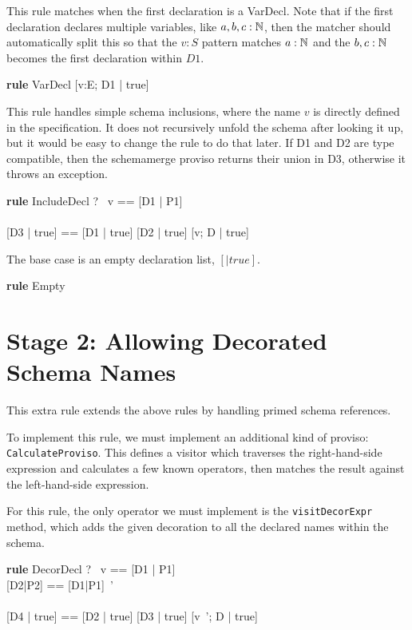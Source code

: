 \documentclass{article}
\newenvironment{zedrule}[1]{\par\textbf{rule }#1\vspace{-1ex}\infrule}{\endinfrule}
\newcommand{\derives}{\derive{}}
\newcommand{\proviso}{\raisebox{0.5ex}{${}_{\blacktriangleright}\ $}}%
\newcommand{\schemamerge}{\mathbin{\textbf{schemamerge}}}
\begin{document}
This rule matches when the first declaration is a VarDecl.
Note that if the first declaration declares multiple variables,
like $a,b,c:{\mathbb N}$, then the matcher should automatically split this
so that the $v:S$ pattern matches $a:{\mathbb N}$ and the $b,c:{\mathbb N}$
becomes the first declaration within $D1$.
\begin{zedrule}{VarDecl}
   [D1 | true] \unfoldsTo [D2 | P2]
\derives
   [v:E; D1 | true] \unfoldsTo [v:E; D2 | P2]
\end{zedrule}

This rule handles simple schema inclusions, where the name
$v$ is directly defined in the specification.  It does not
recursively unfold the schema after looking it up, but it would
be easy to change the rule to do that later.  If D1 and D2 are 
type compatible, then the schemamerge proviso returns their
union in D3, otherwise it throws an exception.

\begin{zedrule}{IncludeDecl}
   \proviso ?~ v == [D1 | P1] \\
   [D | true] \unfoldsTo [D2 | P2] \\
   \proviso [D3 | true] == [D1 | true] \schemamerge [D2 | true]
\derives
   [v; D | true] \unfoldsTo [D3 | P1 \land P2]
\end{zedrule}

The base case is an empty declaration list, $[|true]$.
\begin{zedrule}{Empty}
   [~ | true] \unfoldsTo [~ | true]
\end{zedrule}


\section*{Stage 2: Allowing Decorated Schema Names}

This extra rule extends the above rules by handling primed schema
references.

To implement this rule, we must implement an additional kind of
proviso: \verb!CalculateProviso!.  This defines a visitor which
traverses the right-hand-side expression and calculates a few known
operators, then matches the result against the left-hand-side expression.

For this rule, the only operator we must implement is the
\verb!visitDecorExpr! method, which adds the given decoration to all the
declared names within the schema.

\begin{zedrule}{DecorDecl}
   \proviso ?~ v == [D1 | P1] \\
   \proviso [D2|P2] == [D1|P1]~' \\
   [D | true] \unfoldsTo [D3 | P3] \\
   \proviso [D4 | true] == [D2 | true] \schemamerge [D3 | true]
\derives
   [v~'; D | true] \unfoldsTo [D4 | P2 \land P3]
\end{zedrule}
\end{document}
